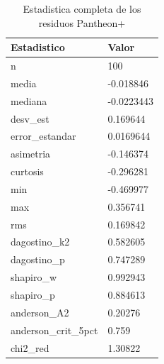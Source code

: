 \begin{table}[htbp]
  \centering
  \caption{Estadistica completa de los residuos Pantheon+}
  \begin{tabular}{ll}
    \toprule
    Estadistico & Valor \\
    \midrule
n & 100 \\
media & -0.018846 \\
mediana & -0.0223443 \\
desv_est & 0.169644 \\
error_estandar & 0.0169644 \\
asimetria & -0.146374 \\
curtosis & -0.296281 \\
min & -0.469977 \\
max & 0.356741 \\
rms & 0.169842 \\
dagostino_k2 & 0.582605 \\
dagostino_p & 0.747289 \\
shapiro_w & 0.992943 \\
shapiro_p & 0.884613 \\
anderson_A2 & 0.20276 \\
anderson_crit_5pct & 0.759 \\
chi2_red & 1.30822 \\
    \bottomrule
  \end{tabular}
\end{table}

